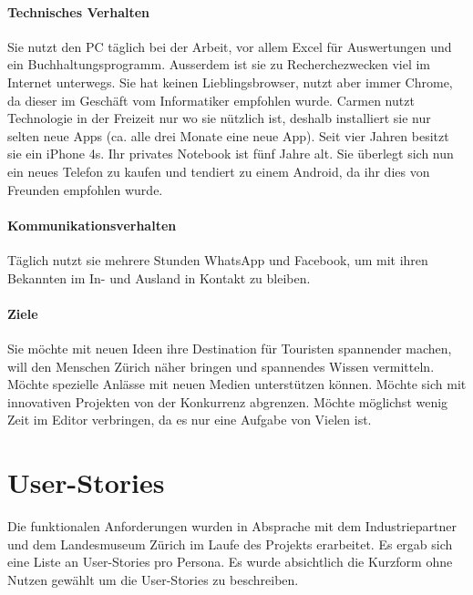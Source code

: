 \paragraph{Technisches Verhalten} 
Sie nutzt den PC täglich bei der Arbeit, vor allem Excel für Auswertungen und ein Buchhaltungsprogramm. Ausserdem ist sie zu Recherchezwecken viel im Internet unterwegs. Sie hat keinen Lieblingsbrowser, nutzt aber immer Chrome, da dieser im Geschäft vom Informatiker empfohlen wurde. Carmen nutzt Technologie in der Freizeit nur wo sie nützlich ist, deshalb installiert sie nur selten neue Apps (ca. alle drei Monate eine neue App). Seit vier Jahren besitzt sie ein iPhone 4s. Ihr privates Notebook ist fünf Jahre alt. Sie überlegt sich nun ein neues Telefon zu kaufen und tendiert zu einem Android, da ihr dies von Freunden empfohlen wurde. 

\paragraph{Kommunikationsverhalten}
Täglich nutzt sie mehrere Stunden WhatsApp und Facebook, um mit ihren Bekannten im In- und Ausland in Kontakt zu bleiben.

\paragraph{Ziele} 
Sie möchte mit neuen Ideen ihre Destination für Touristen spannender machen, will den Menschen Zürich näher bringen und spannendes Wissen vermitteln. Möchte spezielle Anlässe mit neuen Medien unterstützen können. Möchte sich mit innovativen Projekten von der Konkurrenz abgrenzen. Möchte möglichst wenig Zeit im Editor verbringen, da es nur eine Aufgabe von Vielen ist.

\section{User-Stories}

Die funktionalen Anforderungen wurden in Absprache mit dem Industriepartner und dem Landesmuseum Zürich im Laufe des Projekts erarbeitet. Es ergab sich eine Liste an User-Stories pro Persona. Es wurde absichtlich die Kurzform ohne Nutzen gewählt um die User-Stories zu beschreiben.

